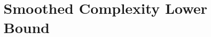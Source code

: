 \documentclass{article}\usepackage[a4paper,margin=20mm]{geometry}
\newcommand{\R}{\mathbb R}
\newcommand{\aff}{\operatorname{affhull}}
\newcommand{\conv}{\operatorname{conv}}
\newcommand{\dist}{\operatorname{dist}}
\begin{document}








\section{Smoothed Complexity Lower Bound}\label{sec:lb}
\end{document}
